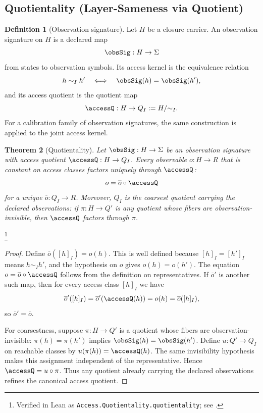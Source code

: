 \documentclass[11pt]{article}
\newtheorem{theorem}{Theorem}[section]
\theoremstyle{definition}
\newtheorem{definition}[theorem]{Definition}
\begin{document}
\subsection{Quotientality (Layer-Sameness via Quotient)}\label{sec:access:quotientality}

\begin{definition}[Observation signature]\label{def:obs-signature}
Let \(H\) be a closure carrier.  An observation signature on \(H\)
is a declared map
\[
  \obsSig:H\to\Sigma
\]
from states to observation symbols.  Its access kernel is the
equivalence relation
\[
  h\sim_I h'
  \quad\Longleftrightarrow\quad
  \obsSig(h)=\obsSig(h'),
\]
and its access quotient is the quotient map
\[
  \accessQ:H\to Q_I:=H/{\sim_I}.
\]
For a calibration family of observation signatures, the same
construction is applied to the joint access kernel.
\end{definition}

\begin{theorem}[Quotientality]\label{thm:F10}
Let \(\obsSig:H\to\Sigma\) be an observation signature with access
quotient \(\accessQ:H\to Q_I\).  Every observable \(o:H\to R\) that
is constant on access classes factors uniquely through
\(\accessQ\):
\[
  o=\overline o\circ \accessQ
\]
for a unique \(\overline o:Q_I\to R\).  Moreover, \(Q_I\) is the
coarsest quotient carrying the declared observations: if
\(\pi:H\to Q'\) is any quotient whose fibers are observation-invisible,
then \(\accessQ\) factors through \(\pi\).
\end{theorem}
\footnote{Verified in Lean as
\texttt{Access.Quotientality.quotientality}; see
.}
\begin{proof}
Define \(\overline o([h]_I)=o(h)\).  This is well defined because
\([h]_I=[h']_I\) means \(h\sim_I h'\), and the hypothesis on \(o\)
gives \(o(h)=o(h')\).  The equation
\(o=\overline o\circ\accessQ\) follows from the definition on
representatives.  If \(\overline o'\) is another such map, then for
every access class \([h]_I\) we have
\[
  \overline o'([h]_I)
  =
  \overline o'(\accessQ(h))
  =
  o(h)
  =
  \overline o([h]_I),
\]
so \(\overline o'=\overline o\).

For coarsestness, suppose \(\pi:H\to Q'\) is a quotient whose fibers
are observation-invisible: \(\pi(h)=\pi(h')\) implies
\(\obsSig(h)=\obsSig(h')\).  Define \(u:Q'\to Q_I\) on reachable
classes by \(u(\pi(h))=\accessQ(h)\).  The same invisibility
hypothesis makes this assignment independent of the representative.
Hence \(\accessQ=u\circ\pi\).  Thus any quotient already carrying the
declared observations refines the canonical access quotient.
\end{proof}
\end{document}
